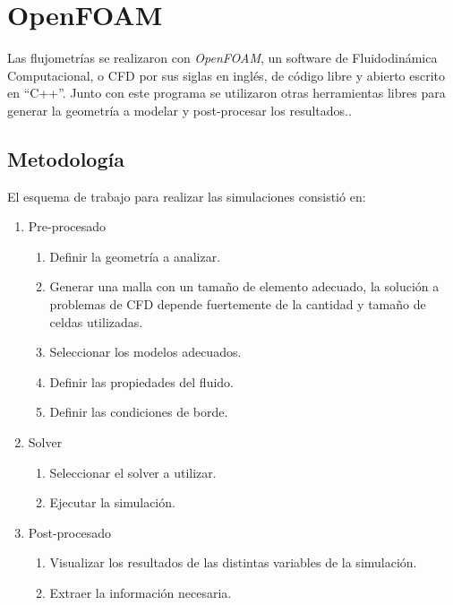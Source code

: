 \section{OpenFOAM}
%
Las flujometrías se realizaron con \emph{OpenFOAM}, un software de
Fluidodinámica Computacional, o CFD por sus siglas en inglés, de código libre y
abierto escrito en ``C++''.
%
%
Junto con este programa se utilizaron otras herramientas libres para generar la
geometría a modelar y post-procesar los resultados..
%
\subsection{Metodología}
%
El esquema de trabajo para realizar las simulaciones consistió en:

\begin{enumerate}
    \item Pre-procesado
        \begin{enumerate}
            \item Definir la geometría a analizar.
            \item Generar una malla con un tamaño de elemento adecuado, la
                solución a problemas de CFD depende fuertemente de la cantidad
                y tamaño de celdas utilizadas.
            \item Seleccionar los modelos adecuados.
            \item Definir las propiedades del fluido.
            \item Definir las condiciones de borde.

        \end{enumerate}
    \item Solver
    \begin{enumerate} \item Seleccionar el solver a utilizar.
            \item Ejecutar la simulación.
    \end{enumerate}
\item Post-procesado
    \begin{enumerate}
        \item Visualizar los resultados de las distintas variables de la
            simulación.
        \item Extraer la información necesaria.
    \end{enumerate}
\end{enumerate}


